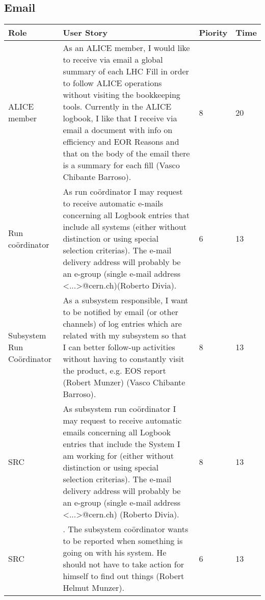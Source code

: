 \subsection{Email}
\begin{longtable}{ | p{2cm} | p{8cm} | p{1.5cm} | l |}
\hline
Role & User Story & Piority & Time \\ \hline
ALICE member & As an ALICE member, I would like to receive via email a global summary of each LHC Fill in order to follow ALICE operations without visiting the bookkeeping tools. Currently in the ALICE logbook, I like that I receive via email a document with info on efficiency and EOR Reasons and that on the body of the email there is a summary for
each fill (Vasco Chibante Barroso). & 8 & 20 \\ \hline
Run coördinator & As run coördinator I may request to receive automatic e-mails concerning all Logbook entries that include all systems (either without distinction or using special selection criterias). The e-mail delivery address will probably be an e-group (single e-mail address <...>@cern.ch)(Roberto Divia). & 6 & 13 \\ \hline
Subsystem Run Coördinator &  As a subsystem responsible, I want to be notified by email (or other
channels) of log entries which are related with my subsystem so that I can better follow-up activities without having to constantly visit the product, e.g. EOS report (Robert Munzer) (Vasco Chibante Barroso). & 8 & 13 \\ \hline
SRC & As subsystem run coördinator I may request to receive automatic emails concerning all Logbook entries that include the System I am working for (either without distinction or using special selection criterias). The e-mail delivery address will probably be an e-group (single e-mail address <...>@cern.ch) (Roberto Divia). & 8 & 13 \\ \hline
SRC & . The subsystem coördinator wants to be reported when something is going on with his system. He should not have to take action for himself to find out things (Robert Helmut Munzer). & 6 & 13 \\ \hline

\end{longtable}
\newpage
